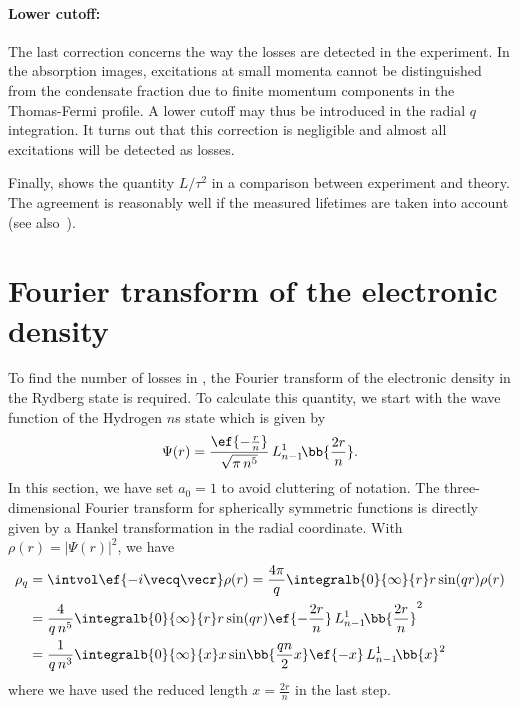 \paragraph{Lower cutoff:}
The last correction concerns the way the losses are detected in the experiment. In the absorption images, excitations at small momenta cannot be distinguished from the condensate fraction due to finite momentum components in the Thomas-Fermi profile. A lower cutoff may thus be introduced in the radial $q$ integration. It turns out that this correction is negligible and almost all excitations will be detected as losses.

Finally,  shows the quantity $L/\tau^2$ in a comparison between experiment and theory. The agreement is reasonably well if the measured lifetimes are taken into account (see also~\cite{Karpiuk2014}).


\section{Fourier transform of the electronic density}
To find the number of losses in , the Fourier transform of the electronic density in the Rydberg state is required. To calculate this quantity, we start with the wave function of the Hydrogen $n$s state which is given by
\begin{align}
\Psi(r)=\frac{\ef{-\frac{r}{n}}}{\sqrt{\pi\, n^5}} \, L_{n-1}^1\!\bb{\frac{2 r}{n}}.
\end{align}
In this section, we have set $a_0=1$ to avoid cluttering of notation.
The three-dimensional Fourier transform for spherically symmetric functions is directly given by a Hankel transformation in the radial coordinate. With $\rho(r)=|\Psi(r)|^2$, we have
\begin{align}
    \rho_q&=\intvol \ef{-i \vecq \vecr} \rho(r) =\frac{4\pi}{q}\integralb{0}{\infty}{r} r \sin(qr) \rho(r) \\
    &=\frac{4}{q\,n^5}\integralb{0}{\infty}{r} r \sin(qr) \ef{-\frac{2r}{n}} \, L_{n-1}^1\!\bb{\frac{2 r}{n}}^2 \\
    &=\frac{1}{q\,n^3}\integralb{0}{\infty}{x} x \sin\!\bb{\frac{qn}{2}x} \ef{-x} \, L_{n-1}^1\!\bb{x}^2
\end{align}
where we have used the reduced length $x=\frac{2r}{n}$ in the last step.
